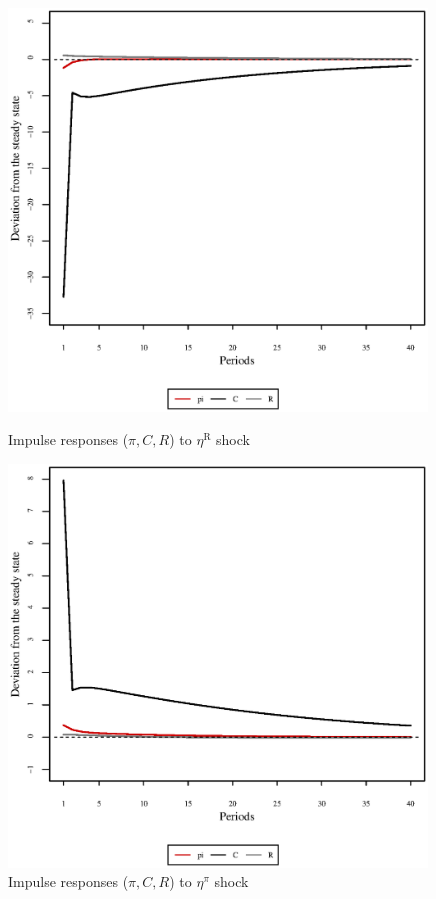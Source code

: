 \begin{figure}[h]
\begin{minipage}{0.5\textwidth}
\vspace*{-3em}
\centering
\includegraphics[width=0.99\textwidth, scale=0.55]{plots/plot_103.eps}
\caption{Impulse responses ($\pi, C, R$) to $\eta^{\mathrm{R}}$ shock}
\end{minipage}
\begin{minipage}{0.5\textwidth}
\vspace*{-3em}
\centering
\includegraphics[width=0.99\textwidth, scale=0.55]{plots/plot_104.eps}
\caption{Impulse responses ($\pi, C, R$) to $\eta^{\pi}$ shock}
\end{minipage}
\end{figure}

